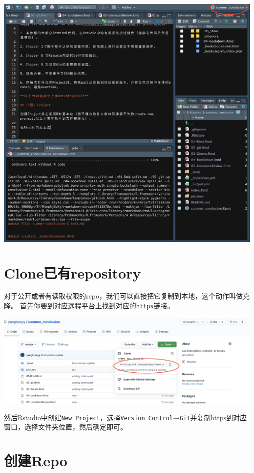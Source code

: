 \documentclass[
  letterpaper,
  DIV=11,
  numbers=noendperiod,
  oneside]{scrreprt}
\begin{document}
\includegraphics{./images/git_project.png}

\hypertarget{sec-clone}{%
\section{Clone已有repository}\label{sec-clone}}

对于公开或者有读取权限的repo，我们可以直接把它复制到本地，这个动作叫做克隆。
首先你要到对应远程平台上找到对应的\texttt{https}链接。

\includegraphics{./images/git_clone.png}

然后Rstudio中创建\texttt{New\ Project}，选择\texttt{Version\ Control}→\texttt{Git}并复制https到对应窗口，选择文件夹位置，然后确定即可。

\hypertarget{ux521bux5efarepo}{%
\section{创建Repo}\label{ux521bux5efarepo}}
\end{document}
